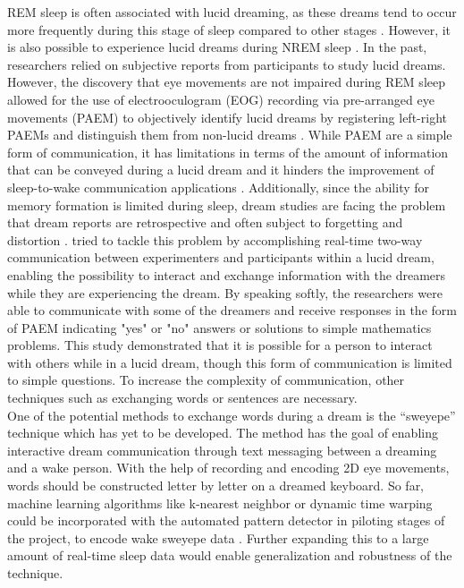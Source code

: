 \documentclass{article}
\begin{document}
REM sleep is often associated with lucid dreaming, as these dreams tend to occur more frequently during this stage of sleep compared to other stages \citep{la1981lucid, stumbrys2012induction}. However, it is also possible to experience lucid dreams during NREM sleep \citep{dane1984comparison, erlacher2020wake, stumbrys2012lucid}. In the past, researchers relied on subjective reports from participants to study lucid dreams.
\\
However, the discovery that eye movements are not impaired during REM sleep \citep{aserinsky1953regularly, chase1990flatonia} allowed for the use of electrooculogram (EOG) recording via pre-arranged eye movements (PAEM) to objectively identify lucid dreams \citep{hearne1978lucid, la1981lucid} by registering left-right PAEMs and distinguish them from non-lucid dreams \citep{hearne1978lucid}. While PAEM are a simple form of communication, it has limitations in terms of the amount of information that can be conveyed during a lucid dream \citep{appel2017investigating} and it hinders the improvement of sleep-to-wake communication applications \citep{konkoly2021real}. Additionally, since the ability for memory formation is limited during sleep, dream studies are facing the problem that dream reports are retrospective and often subject to forgetting and distortion \citep{konkoly2021real}.
\citet{konkoly2021real} tried to tackle this problem by accomplishing real-time two-way communication between experimenters and participants within a lucid dream, enabling the possibility to interact and exchange information with the dreamers while they are experiencing the dream. By speaking softly, the researchers were able to communicate with some of the dreamers and receive responses in the form of PAEM indicating "yes" or "no" answers or solutions to simple mathematics problems. This study demonstrated that it is possible for a person to interact with others while in a lucid dream, though this form of communication is limited to simple questions. To increase the complexity of communication, other techniques such as exchanging words or sentences are necessary.
\\
One of the potential methods to exchange words during a dream is the “sweyepe” technique \citep{appel2022sd} which has yet to be developed. The method has the goal of enabling interactive dream communication through text messaging between a dreaming and a wake person. With the help of recording and encoding 2D eye movements, words should be constructed letter by letter on a dreamed keyboard. So far, machine learning algorithms like k-nearest neighbor or dynamic time warping could be incorporated with the automated pattern detector in piloting stages of the project, to encode wake sweyepe data \citep{appel2022polysomnography}. Further expanding this to a large amount of real-time sleep data would enable generalization and robustness of the technique.
\end{document}
